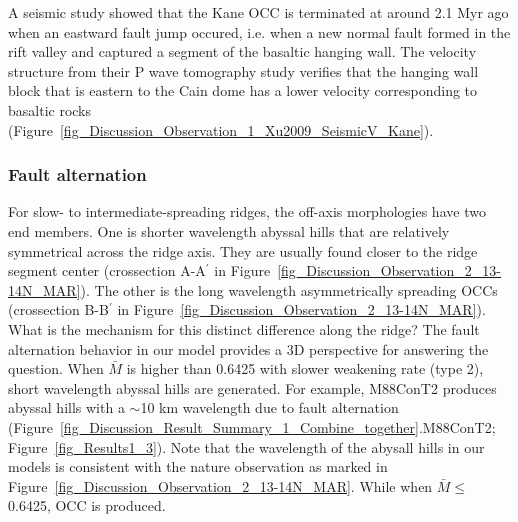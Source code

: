 \documentclass[draft,gc]{agutex}
\begin{document}
\begin{article}
A seismic study \citep{Xu2009} showed that the Kane OCC is terminated at around 2.1 Myr ago when an eastward fault jump occured, i.e. when a new normal fault formed in the rift valley and captured a segment of the basaltic hanging wall. The velocity structure from their P wave tomography study verifies that the hanging wall block that is eastern to the Cain dome has a lower velocity corresponding to basaltic rocks (Figure~\ref{fig_Discussion_Observation_1_Xu2009_SeismicV_Kane}).

\subsubsection{Fault alternation}
For slow- to intermediate-spreading ridges, the off-axis morphologies have two end members. One is shorter wavelength abyssal hills that are relatively symmetrical across the ridge axis. They are usually found closer to the ridge segment center (crossection A-A$^{\prime}$ in Figure~\ref{fig_Discussion_Observation_2_13-14N_MAR}). The other is the long wavelength asymmetrically spreading OCCs (crossection B-B$^{\prime}$ in Figure~\ref{fig_Discussion_Observation_2_13-14N_MAR}). What is the mechanism for this distinct difference along the ridge? The fault alternation behavior in our model provides a 3D perspective for answering the question. When $\bar{M}$ is higher than 0.6425 with slower weakening rate (type 2), short wavelength abyssal hills are generated. For example, M88ConT2 produces abyssal hills with a $\sim$10 km wavelength due to fault alternation (Figure~\ref{fig_Discussion_Result_Summary_1_Combine_together}.M88ConT2; Figure~\ref{fig_Results1_3}). Note that the wavelength of the abysall hills in our models is consistent with the nature observation as marked in Figure~\ref{fig_Discussion_Observation_2_13-14N_MAR}. While when $\bar{M} \le$ 0.6425, OCC is produced.


\end{article}
\end{document}
